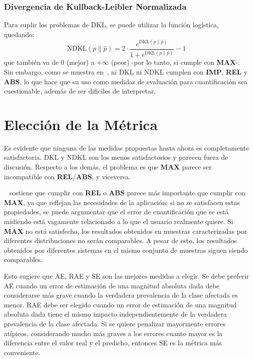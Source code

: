 \subsubsection{Divergencia de Kullback-Leibler Normalizada}\label{evaluacion:ndkl}

Para suplir los problemas de DKL, se puede utilizar la función logística,
quedando:
\begin{equation}
    {\text{NDKL}}(p\parallel \hat{p}) = 2 \cdot \frac{e^{{\text{DKL}}(p\parallel \hat{p})}}{1+e^{{\text{DKL}}(p\parallel \hat{p})}}-1
\end{equation}
que también va de {0} (mejor) a {+$\infty$} (peor) -por lo tanto, si cumple con
{\bf MAX}-. Sin embargo, como se muestra en~\cite{sebastiani2020evaluation}, ni
DKL ni NDKL cumplen con {\bf IMP}, {\bf REL} y {\bf ABS}, lo que hace que su uso
como medidas de evaluación para cuantificación sea cuestionable, además de ser
dificiles de interpretar.

\section{Elección de la Métrica}\label{evaluacion:eleccion}

Es evidente que ninguna de las medidas propuestas hasta ahora es completamente
satisfactoria. DKL y NDKL son los menos satisfactorios y parecen fuera de
discusión. Respecto a los demás, el problema es que {\bf MAX} parece ser
incompatible con {\bf REL}/{\bf ABS}, y viceversa.

~\citet{sebastiani2020evaluation} sostiene que cumplir con {\bf REL} o {\bf ABS}
parece más importante que cumplir con {\bf MAX}, ya que reflejan las necesidades
de la aplicación; si no se satisfacen estas propiedades, se puede argumentar que
el error de cuantificación que se está midiendo está vagamente relacionado a lo
que el usuario realmente quiere. Si {\bf MAX} no está satisfecho, los resultados
obtenidos en muestras caracterizadas por diferentes distribuciones no serán
comparables. A pesar de esto, los resultados obtenidos por diferentes sistemas
en el mismo conjunto de muestras siguen siendo comparables.

Esto sugiere que AE, RAE y SE son las mejores medidas a elegir. Se debe preferir
AE cuando un error de estimación de una magnitud absoluta dada debe considerarse
más grave cuando la verdadera prevalencia de la clase afectada es menor. RAE
debe ser elegido cuando un error de estimación de una magnitud absoluta dada
tiene el mismo impacto independientemente de la verdadera prevalencia de la
clase afectada. Si se quiere penalizar mayormente errores atípicos, considerando
mucho más graves a los errores cuanto mayor es la diferencia entre el valor real
y el predicho, entonces SE es la métrica más conveniente.

